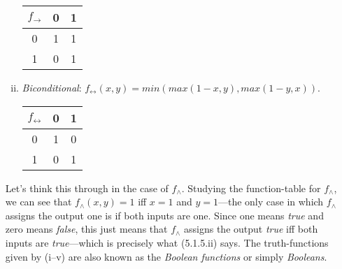 \begin{enumerate}[\thesection.1]
\begin{enumerate}[(i)]
			\begin{center}
			\begin{tabular}{c | c c}
			
			$f_\to$ & 0 & 1\\\hline
			
			0 & 1 & 1 \\

			1 & 0 & 1
		
			\end{tabular}
			\end{center}
			
			\item \emph{Biconditional}: $f_\leftrightarrow(x,y)=min(max(1-x,y), max(1-y,x))$.
			
			\begin{center}
			\begin{tabular}{c | c c}
			
			$f_\leftrightarrow$ & 0 & 1\\\hline
		
			0 & 1 & 0 \\
		
			1 & 0 & 1
		
			\end{tabular}
			\end{center}
		
		\end{enumerate}
		Let's think this through in the case of $f_\land$. Studying the function-table for $f_\land$, we can see that $f_\land(x,y)=1$ iff $x=1$ and $y=1$---the only case in which $f_\land$ assigns the output one is if both inputs are one. Since one means \emph{true} and zero means \emph{false}, this just means that $f_\land$ assigns the output \emph{true} iff both inputs are \emph{true}---which is precisely what (5.1.5.ii) says. The truth-functions given by (i--v) are also known as the \emph{Boolean functions} or simply \emph{Booleans}.
		

\end{enumerate}

